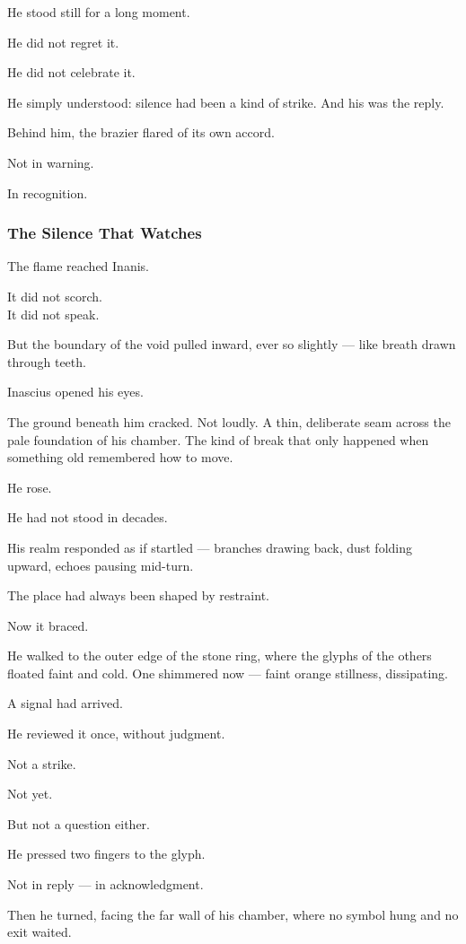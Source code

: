 \documentclass[12pt]{article}
\begin{document}
He stood still for a long moment.

He did not regret it.

He did not celebrate it.

He simply understood: silence had been a kind of strike. And his was the reply.

Behind him, the brazier flared of its own accord.

Not in warning.

In recognition.

\dotfill

\subsubsection{The Silence That Watches}

The flame reached Inanis.

It did not scorch.\\
It did not speak.

But the boundary of the void pulled inward, ever so slightly — like breath drawn through teeth.

Inascius opened his eyes.

The ground beneath him cracked. Not loudly. A thin, deliberate seam across the pale foundation of his chamber. The kind of break that only happened when something old remembered how to move.

He rose.

He had not stood in decades.

His realm responded as if startled — branches drawing back, dust folding upward, echoes pausing mid-turn.

The place had always been shaped by restraint.

Now it braced.

He walked to the outer edge of the stone ring, where the glyphs of the others floated faint and cold. One shimmered now — faint orange stillness, dissipating.

A signal had arrived.

He reviewed it once, without judgment.

Not a strike.

Not yet.

But not a question either.

He pressed two fingers to the glyph.

Not in reply — in acknowledgment.

Then he turned, facing the far wall of his chamber, where no symbol hung and no exit waited.
\end{document}
